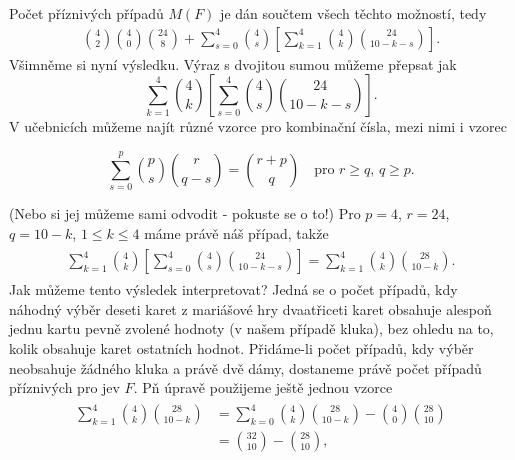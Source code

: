 \begin{mdframed}[style=mdexam]
\begin{example}
      Počet příznivých případů \(M(F)\) je dán součtem všech těchto možností, tedy
      \begin{gather*}
        \binom{4}{2}\binom{4}{0}\binom{24}{8} + \sum^{4}_{s=0}\binom{4}{s}
        \left[\sum^{4}_{k=1}\binom{4}{k}\binom{24}{10 - k - s}\right].
      \end{gather*}
      Všimněme si nyní výsledku. Výraz s dvojitou sumou můžeme přepsat jak
      \begin{equation*}
        \sum^{4}_{k=1}\binom{4}{k}\left[\sum^{4}_{s=0}\binom{4}{s}\binom{24}{10 - k - s}
          \right].
      \end{equation*}
      V učebnicích můžeme najít různé vzorce pro kombinační čísla, mezi nimi i vzorec
      \begin{mdframed}[style=highlight]
        \begin{equation}\label{mai:eq084}
          \sum^{p}_{s=0}\binom{p}{s}\binom{r}{q - s} = \binom{r + p}{q} 
          \quad\text{pro } r\geq q,\,q \geq p.
        \end{equation}
      \end{mdframed}
      (Nebo si jej můžeme sami odvodit - pokuste se o to!) Pro \(p = 4\), \(r = 24\), \(q = 10 -
      k\), \(1 \leq k \leq 4\) máme právě náš případ, takže
      \begin{gather*} 
        \begin{align*}
          \sum^{4}_{k=1}\binom{4}{k}\left[\sum^{4}_{s=0}\binom{4}{s}\binom{24}{10 - k - s}\right] = 
          \sum^{4}_{k=1}\binom{4}{k}\binom{28}{10 - k}.
        \end{align*}
      \end{gather*}
      Jak můžeme tento výsledek interpretovat? Jedná se o počet případů, kdy náhodný výběr deseti
      karet z mariášové hry dvaatřiceti karet obsahuje alespoň jednu kartu pevně zvolené hodnoty (v
      našem případě kluka), bez ohledu na to, kolik obsahuje karet ostatních hodnot. Přidáme-li
      počet případů, kdy výběr neobsahuje žádného kluka a právě dvě dámy, dostaneme právě počet
      případů příznivých pro jev \(F\). Pň úpravě použijeme ještě jednou vzorce
      \begin{gather*} 
        \begin{align*}
        \sum^{4}_{k=1}\binom{4}{k}\binom{28}{10 - k}  &= 
        \sum^{4}_{k=0}\binom{4}{k}\binom{28}{10 - k} - \binom{4}{0}\binom{28}{10}                 \\
                                                      &=\binom{32}{10} - \binom{28}{10},
      \end{align*}

\end{gather*}
\end{example}
\end{mdframed}

